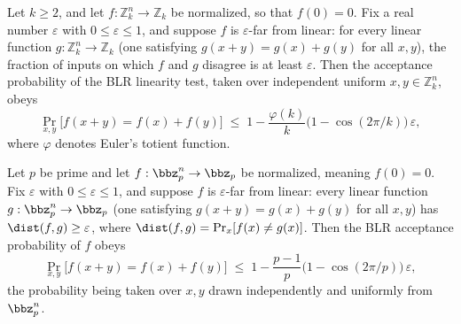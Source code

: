 \begin{lemma}
\label{ZkBLR.BLR_soundness_general}
\leanok
{}
Let $k \ge 2$, and let $f : \mathbb{Z}_k^n \to \mathbb{Z}_k$ be normalized, so that
$f(0) = 0$. Fix a real number $\varepsilon$ with $0 \le \varepsilon \le 1$, and suppose
$f$ is $\varepsilon$-far from linear: for every linear function $g : \mathbb{Z}_k^n \to
\mathbb{Z}_k$ (one satisfying $g(x+y) = g(x)+g(y)$ for all $x,y$), the fraction of
inputs on which $f$ and $g$ disagree is at least $\varepsilon$. Then the acceptance
probability of the BLR linearity test, taken over independent uniform $x, y \in
\mathbb{Z}_k^n$, obeys
\[
  \Pr_{x,y}\bigl[f(x+y) = f(x)+f(y)\bigr]
  \;\le\; 1 - \frac{\varphi(k)}{k}\bigl(1 - \cos(2\pi/k)\bigr)\,\varepsilon,
\]
where $\varphi$ denotes Euler's totient function.
\end{lemma}

\begin{lemma}
\label{ZkBLR.BLR_soundness_prime}
\leanok
{}
Let $p$ be prime and let $f : \bbz_p^n \to \bbz_p$ be normalized, meaning $f(0) = 0$.
Fix $\varepsilon$ with $0 \le \varepsilon \le 1$, and suppose $f$ is $\varepsilon$-far
from linear: every linear function $g : \bbz_p^n \to \bbz_p$ (one satisfying $g(x+y) =
g(x)+g(y)$ for all $x,y$) has $\dist(f,g) \ge \varepsilon$, where $\dist(f,g) =
\Pr_x[f(x) \ne g(x)]$. Then the BLR acceptance probability of $f$ obeys
\[
  \Pr_{x,y}\bigl[f(x+y) = f(x)+f(y)\bigr]
  \;\le\; 1 - \frac{p-1}{p}\bigl(1 - \cos(2\pi/p)\bigr)\,\varepsilon,
\]
the probability being taken over $x,y$ drawn independently and uniformly from
$\bbz_p^n$.
\end{lemma}
